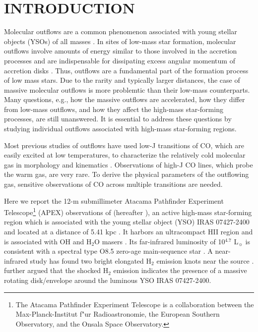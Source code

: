 \section{INTRODUCTION}
Molecular outflows are a common phenomenon associated with young stellar objects (YSOs) of all masses \citep{ 1985ARA&A..23..267L,1993prpl.conf..603F,2001ApJ...552L.167Z,2002A&A...383..892B,2015MNRAS.453..645M}. In sites of low-mass star formation, molecular outflows involve amounts of energy similar to those involved in the accretion processes and are indispensable for dissipating excess angular momentum of accretion disks \citep{1987ARA&A..25...23S, 1996ARA&A..34..111B}. Thus, outflows are a fundamental part of the formation process of low mass stars. Due to the rarity and typically larger distances, the case of massive molecular outflows is more problemtic than their low-mass counterparts. Many questions, e.g., how the massive outflows are accelerated, how they differ from low-mass outflows, and how they affect the high-mass star-forming processes, are still unanswered. It is essential to address these questions by studying individual outflows associated with high-mass star-forming regions. 

Most previous studies of outflows have used low-J transitions of CO, which are easily excited at low temperatures, to characterize the relatively cold molecular gas in morphology and kinematics \citep{2009ApJ...696...66Q,  2009ApJ...702L..66Q, 2011ApJ...728....6Q}. Observations of high-J CO lines, which probe the warm gas, are very rare. To derive the physical parameters of the outflowing gas, sensitive observations of CO across multiple transitions are needed. 

Here we report the 12-m submillimeter Atacama Pathfinder Experiment Telescope\footnote{    The Atacama Pathfinder Experiment Telescope is a collaboration between the Max-Planck-Institut f"ur Radioastronomie, the European Southern Observatory, and the Onsala Space Observatory.} (APEX) observations of  (hereafter ), an active high-mass star-forming region which is associated with the young stellar object (YSO) IRAS 07427-2400 and located at a distance of 5.41 kpc \citep{2015PASJ...67...69S}. It harbors an ultracompact HII region and is associated with OH and H$_2$O masers \citep{1993AJ....105.1495H,1997MNRAS.289..203C,1998AJ....116.1897M,1999ApJS..123..487M,2003MNRAS.341..551C}. Its far-infrared luminosity of 10$^{4.7}$ L$_\sun$ is consistent with a spectral type O8.5 zero-age main-sequence star \citep{1998AJ....116.1897M}. A near-infrared study has found two bright elongated H$_2$ emission knots near the source \citep{2002ApJ...576..313K}. \citet{2003A&A...412..175K} further argued that the shocked H$_2$ emission indicates the presence of a massive rotating disk/envelope around the luminous YSO IRAS 07427-2400. 

